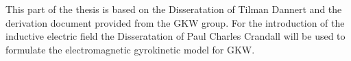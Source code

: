 \bigskip
This part of the thesis is based on the Disseratation of Tilman Dannert\cite{Dannert_PHD} and the derivation document provided from the GKW group\cite{Derivation}. For the introduction of the inductive electric field the Disseratation of Paul Charles Crandall\cite{Crandall_PHD} will be used to formulate the electromagnetic gyrokinetic model for GKW.

\newpage

